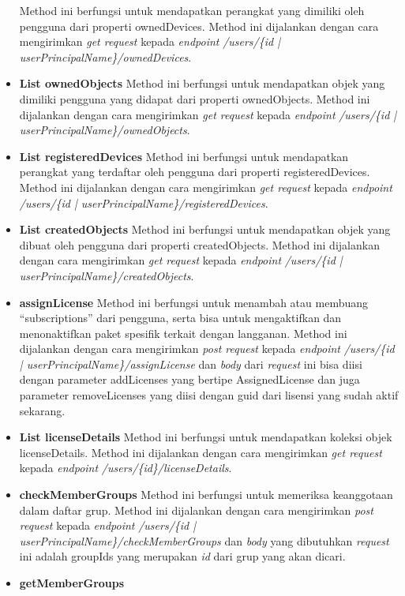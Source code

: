 \begin{itemize}
	Method ini berfungsi untuk mendapatkan perangkat yang dimiliki oleh pengguna dari properti ownedDevices. Method ini dijalankan dengan cara mengirimkan \textit{get request} kepada \textit{endpoint} \textit{/users/\{id | userPrincipalName\}/ownedDevices}.
	\item \textbf{List ownedObjects}
	Method ini berfungsi untuk mendapatkan objek yang dimiliki pengguna yang didapat dari properti ownedObjects. Method ini dijalankan dengan cara mengirimkan \textit{get request} kepada \textit{endpoint} \textit{/users/\{id | userPrincipalName\}/ownedObjects}.
	\item \textbf{List registeredDevices}
	Method ini berfungsi untuk mendapatkan perangkat yang terdaftar oleh pengguna dari properti registeredDevices. Method ini dijalankan dengan cara mengirimkan \textit{get request} kepada \textit{endpoint} \textit{/users/\{id | userPrincipalName\}/registeredDevices}.
	\item \textbf{List createdObjects}
	Method ini berfungsi untuk mendapatkan objek yang dibuat oleh pengguna dari properti createdObjects. Method ini dijalankan dengan cara mengirimkan \textit{get request} kepada \textit{endpoint} \textit{/users/\{id | userPrincipalName\}/createdObjects}.
	\item \textbf{assignLicense}
	Method ini berfungsi untuk menambah atau membuang ``subscriptions'' dari pengguna, serta bisa untuk mengaktifkan dan menonaktifkan paket spesifik terkait dengan langganan. Method ini dijalankan dengan cara mengirimkan \textit{post request} kepada \textit{endpoint} \textit{/users/\{id | userPrincipalName\}/assignLicense} dan \textit{body} dari \textit{request} ini bisa diisi dengan parameter addLicenses yang bertipe AssignedLicense dan juga parameter removeLicenses yang diisi dengan guid dari lisensi yang sudah aktif sekarang.
	\item \textbf{List licenseDetails}
	Method ini berfungsi untuk mendapatkan koleksi objek licenseDetails. Method ini dijalankan dengan cara mengirimkan \textit{get request} kepada \textit{endpoint} \textit{/users/\{id\}/licenseDetails}.
	\item \textbf{checkMemberGroups}
	Method ini berfungsi untuk memeriksa keanggotaan dalam daftar grup. Method ini dijalankan dengan cara mengirimkan \textit{post request} kepada \textit{endpoint} \textit{/users/\{id | userPrincipalName\}/checkMemberGroups} dan \textit{body} yang dibutuhkan \textit{request} ini adalah groupIds yang merupakan \textit{id} dari grup yang akan dicari.
	\item \textbf{getMemberGroups}

\end{itemize}
